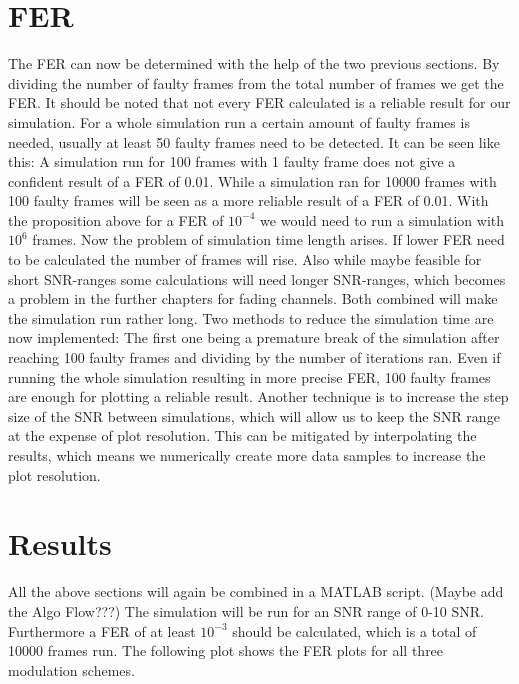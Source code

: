 \section{FER}
The \gls{FER} can now be determined with the help of the two previous sections. By dividing the number of faulty frames from the total number of frames we get the \gls{FER}. It should be noted that not every \gls{FER} calculated is a reliable result for our simulation. For a whole simulation run a certain amount of faulty frames is needed, usually at least 50 faulty frames need to be detected. It can be seen like this: A simulation run for 100 frames with 1 faulty frame does not give a confident result of a \gls{FER} of 0.01. While a simulation ran for 10000 frames with 100 faulty frames will be seen as a more reliable result of a \gls{FER} of 0.01. 
\newline
With the proposition above for a \gls{FER} of $10^{-4}$ we would need to run a simulation with $10^6$ frames. Now the problem of simulation time length arises. If lower \gls{FER} need to be calculated the number of frames will rise. Also while maybe feasible for short SNR-ranges some calculations will need longer SNR-ranges, which becomes a problem in the further chapters for fading channels. Both combined will make the simulation run rather long.
\newline
Two methods to reduce the simulation time are now implemented: The first one being a premature break of the simulation after reaching 100 faulty frames and dividing by the number of iterations ran. Even if running the whole simulation resulting in more precise \gls{FER}, 100 faulty frames are enough for plotting a reliable result. Another technique is to increase the step size of the SNR between simulations, which will allow us to keep the SNR range at the expense of plot resolution. This can be mitigated by interpolating the results, which means we numerically create more data samples to increase the plot resolution.

\newpage
\section{Results}
All the above sections will again be combined in a MATLAB script.
(Maybe add the Algo Flow???)
The simulation will be run for an SNR range of 0-10 SNR. Furthermore a \gls{FER} of at least $10^{-3}$ should be calculated, which is a total of 10000 frames run. The following plot shows the \gls{FER} plots for all three modulation schemes.

